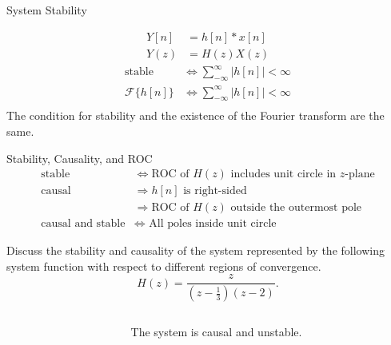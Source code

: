 \begin{frame}{System Stability}
    \begin{center}
        
    \end{center}
    \begin{align*}
        Y[n] &= h[n]\ast x[n]\\
        Y(z) &= H(z)X(z)
    \end{align*}
    \pause
    \begin{align*}
        \text{stable} &\Leftrightarrow \sum_{-\infty}^{\infty} |h[n]| < \infty\\
        \mathcal{F}\{h[n]\}&\Leftrightarrow \sum_{-\infty}^{\infty} |h[n]| < \infty\\
    \end{align*}
    \pause
    The condition for stability and the existence of the Fourier transform are the same.
\end{frame}

\begin{frame}{Stability, Causality, and ROC}
    \begin{align*}
         \text{stable} &\Leftrightarrow \text{ROC of $H(z)$ includes unit circle in $z$-plane}\\
         \text{causal} &\Rightarrow \text{$h[n]$ is right-sided}\\
         &\Rightarrow \text{ROC of $H(z)$ outside the outermost pole}\\
         \text{causal and stable} &\Leftrightarrow \text{ All poles inside unit circle}
    \end{align*}
\end{frame}

\begin{frame}{}
    \begin{example}
        Discuss the stability and causality of the system represented by the following system function with respect to different regions of convergence.
        \begin{equation*}
            H(z) = \frac{z}{\left(z-\frac{1}{3}\right)(z-2)}.
        \end{equation*}
    \end{example}
\end{frame}

\begin{frame}{}
    \begin{columns}
        \begin{column}{3in}
            \begin{center}
                
            \end{center}
        \end{column}
        \begin{column}{2in}
            \pause
            The system is causal and unstable.
        \end{column}
    \end{columns}
\end{frame}



